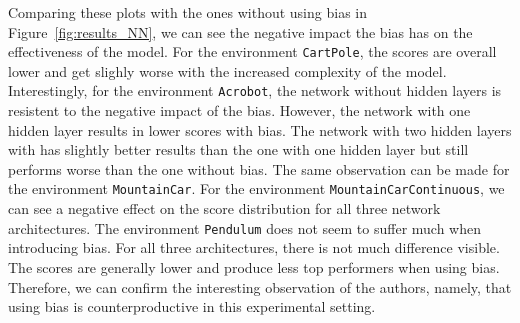 Comparing these plots with the ones without using bias in Figure~\ref{fig:results_NN}, we can see the negative impact the bias has on the effectiveness of the model. For the environment \verb|CartPole|, the scores are overall lower and get slighly worse with the increased complexity of the model. Interestingly, for the environment \verb|Acrobot|, the network without hidden layers is resistent to the negative impact of the bias. However, the network with one hidden layer results in lower scores with bias. The network with two hidden layers with has slightly better results than the one with one hidden layer but still performs worse than the one without bias. The same observation can be made for the environment \verb|MountainCar|. For the environment \verb|MountainCarContinuous|, we can see a negative effect on the score distribution for all three network architectures. The environment \verb|Pendulum| does not seem to suffer much when introducing bias. For all three architectures, there is not much difference visible. The scores are generally lower and produce less top performers when using bias. Therefore, we can confirm the interesting observation of the authors, namely, that using bias is counterproductive in this experimental setting.

